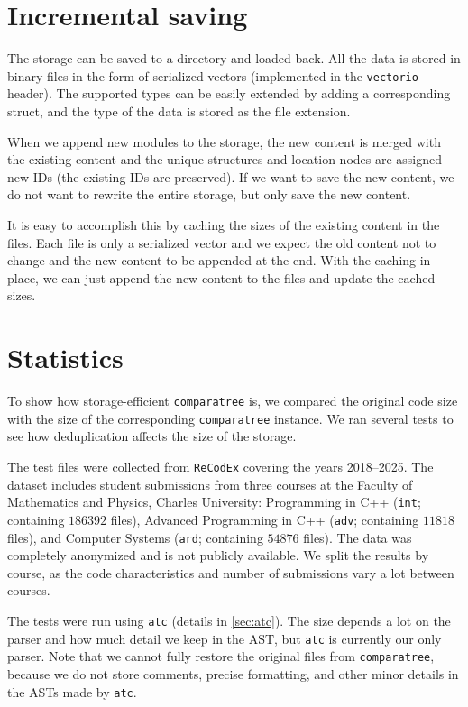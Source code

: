 \section{Incremental saving}

The storage can be saved to a directory and loaded back.
All the data is stored in binary files in the form of serialized vectors (implemented in the \texttt{vectorio} header).
The supported types can be easily extended by adding a corresponding struct, and the type of the data is stored as the file extension.

When we append new modules to the storage, the new content is merged with the existing content and the unique structures and location nodes are assigned new IDs (the existing IDs are preserved).
If we want to save the new content, we do not want to rewrite the entire storage, but only save the new content.

It is easy to accomplish this by caching the sizes of the existing content in the files.
Each file is only a serialized vector and we expect the old content not to change and the new content to be appended at the end.
With the caching in place, we can just append the new content to the files and update the cached sizes.

\section{Statistics}\label{sec:comparatree-statistics}

To show how storage-efficient \texttt{comparatree} is, we compared the original code size with the size of the corresponding \texttt{comparatree} instance.
We ran several tests to see how deduplication affects the size of the storage.

The test files were collected from \texttt{ReCodEx} covering the years 2018--2025.
The dataset includes student submissions from three courses at the Faculty of Mathematics and Physics, Charles University:
Programming in C++ (\texttt{int}; containing $186392$ files), Advanced Programming in C++ (\texttt{adv}; containing $11818$ files), and Computer Systems (\texttt{ard}; containing $54876$ files).
The data was completely anonymized and is not publicly available.
We split the results by course, as the code characteristics and number of submissions vary a lot between courses.

The tests were run using \texttt{atc} (details in \autoref{sec:atc}).
The size depends a lot on the parser and how much detail we keep in the AST, but \texttt{atc} is currently our only parser.
Note that we cannot fully restore the original files from \texttt{comparatree}, because we do not store comments, precise formatting, and other minor details in the ASTs made by \texttt{atc}.


